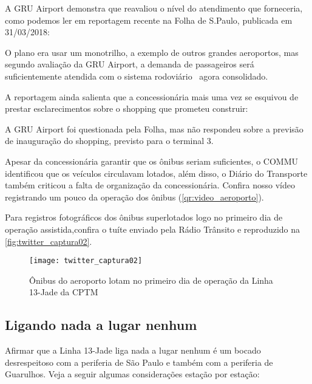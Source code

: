 \documentclass[11pt,fleqn]{book} %
\begin{document}
A GRU Airport demonstra que reavaliou o nível do atendimento que forneceria, como podemos ler em reportagem recente na Folha de S.Paulo, publicada em 31/03/2018:

\begin{citacao}
	O plano era usar um monotrilho, a exemplo de outros grandes aeroportos, mas segundo avaliação da GRU Airport, a demanda de passageiros será suficientemente atendida com o sistema rodoviário \textemdash\ agora consolidado.
\end{citacao}

A reportagem ainda salienta que a concessionária mais uma vez se esquivou de prestar esclarecimentos sobre o shopping que prometeu construir:

\begin{citacao}
	A GRU Airport foi questionada pela Folha, mas não respondeu sobre a previsão de inauguração do shopping, previsto para o terminal 3.
\end{citacao}

Apesar da concessionária garantir que os ônibus seriam suficientes, o COMMU identificou que os veículos circulavam lotados, além disso, o Diário do Transporte também criticou a falta de organização da concessionária. Confira nosso vídeo registrando um pouco da operação dos ônibus (\autoref{qr:video_aeroporto}).

Para registros fotográficos dos ônibus superlotados logo no primeiro dia de operação assistida,confira o tuíte enviado pela Rádio Trânsito e reproduzido na \autoref{fig:twitter_captura02}.

\begin{figure}[htb]
	\caption[Ônibus lotados do aeroporto internacional]{Ônibus do aeroporto lotam no primeiro dia de operação da Linha 13-Jade da CPTM}
	\centering
	\texttt{[image: twitter\_captura02]}
	\label{fig:twitter_captura02}
\end{figure}

\subsection{Ligando nada a lugar nenhum}

Afirmar que a Linha 13-Jade liga nada a lugar nenhum é um bocado desrespeitoso com a periferia de São Paulo e também com a periferia de Guarulhos. Veja a seguir algumas considerações estação por estação:
\end{document}
